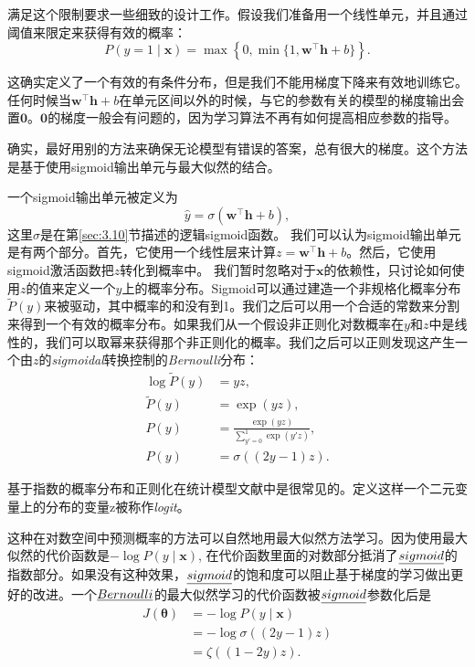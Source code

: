 满足这个限制要求一些细致的设计工作。假设我们准备用一个线性单元，并且通过阈值来限定来获得有效的概率：
\begin{equation}
P(y=1 \mid \bm{x}) = \max \left \{ 0, \min \{1, \bm{w}^\top \bm{h}+b \} \right \}.
\end{equation}

这确实定义了一个有效的有条件分布，但是我们不能用梯度下降来有效地训练它。任何时候当$\bm{w}^\top \bm{h}+b$在单元区间以外的时候，与它的参数有关的模型的梯度输出会置$\bm{0}$。$\bm{0}$的梯度一般会有问题的，因为学习算法不再有如何提高相应参数的指导。

确实，最好用别的方法来确保无论模型有错误的答案，总有很大的梯度。这个方法是基于使用sigmoid输出单元与最大似然的结合。

一个sigmoid输出单元被定义为
\begin{equation}
\hat{y} = \sigma \left (\bm{w}^\top \bm{h} + b \right ),
\end{equation}
这里$\sigma$是在第\ref{sec:3.10}节描述的逻辑sigmoid函数。
我们可以认为sigmoid输出单元是有两个部分。首先，它使用一个线性层来计算$z=\bm{w}^\top \bm{h}+b$。然后，它使用sigmoid激活函数把$z$转化到概率中。
我们暂时忽略对于$\bm{x}$的依赖性，只讨论如何使用$z$的值来定义一个$y$上的概率分布。Sigmoid可以通过建造一个非规格化概率分布$\tilde{P}(y)$来被驱动，其中概率的和没有到1。我们之后可以用一个合适的常数来分割来得到一个有效的概率分布。如果我们从一个假设非正则化对数概率在$y$和$z$中是线性的，我们可以取幂来获得那个非正则化的概率。我们之后可以正则发现这产生一个由$z$的\emph{sigmoidal}转换控制的\emph{Bernoulli}分布：
\begin{align}
\log \tilde{P}(y) &= yz,\\
\tilde{P}(y) &= \exp(yz),\\
P(y) &= \frac{\exp(yz)}{\sum_{y' = 0}^1 \exp(y' z)},\\
P(y) &= \sigma((2y-1)z).
\end{align}

基于指数的概率分布和正则化在统计模型文献中是很常见的。定义这样一个二元变量上的分布的变量z被称作\emph{logit}。

这种在对数空间中预测概率的方法可以自然地用最大似然方法学习。因为使用最大似然的代价函数是$-\log P(y\mid\bm{x})$, 在代价函数里面的对数部分抵消了$\emph{sigmoid}$的指数部分。如果没有这种效果，$\emph{sigmoid}$的饱和度可以阻止基于梯度的学习做出更好的改进。一个$\emph{Bernoulli}$的最大似然学习的代价函数被$\emph{sigmoid}$参数化后是
\begin{align}
J(\bm{\theta}) &= -\log P(y\mid\bm{x})\\
&= -\log \sigma ((2y-1)z)\\
&= \zeta((1-2y)z).
\end{align}


